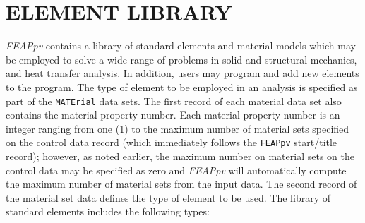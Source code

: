 \chapter[Element Library]{ELEMENT LIBRARY}
\label{elmlib}

{\sl FEAPpv} contains a library of standard elements and material models which may
be employed to solve a wide range of problems in solid and structural mechanics,
and heat transfer analysis.
In addition, users may program and add new elements to the program.
The type of element to
be employed in an analysis is specified as part of the \texttt{MATErial} data
sets.  The first record of each material data set also contains the material
property number.  Each material property number is an integer ranging from
one (1) to the maximum number of material sets specified on the control data
record (which immediately follows the \texttt{FEAPpv} start/title record); however,
as noted earlier,
the maximum number on material sets on the control data may be specified
as zero and {\sl FEAPpv} will
automatically compute the maximum number of material sets from the input data.
The second record of the material set data defines the type of element to be
used.  The library of standard elements includes the following types:

